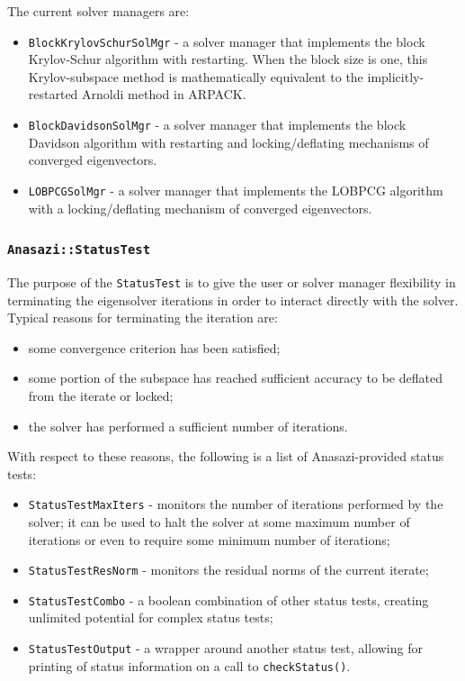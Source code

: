 \documentclass[acmtoms,acmnow]{acmtrans2m}
\newcommand{\aspace}[1]{\texttt{#1}}
\begin{document}
The current solver managers are:
\begin{itemize}
\item
\aspace{BlockKrylovSchurSolMgr} - a solver manager that implements the block Krylov-Schur
algorithm with restarting.  When the block size is one, this Krylov-subspace method is
mathematically equivalent to the implicitly-restarted Arnoldi method in ARPACK.
\item
\aspace{BlockDavidsonSolMgr} - a solver manager that implements the block Davidson
algorithm with restarting and locking/deflating mechanisms of converged eigenvectors.
\item
\aspace{LOBPCGSolMgr} - a solver manager that implements the LOBPCG algorithm with a
locking/deflating mechanism of converged eigenvectors.
\end{itemize}


\subsubsection{\aspace{Anasazi::StatusTest}}

The purpose of the \aspace{StatusTest} is to give the user or solver
manager flexibility in terminating the eigensolver iterations in
order to interact directly with the solver. Typical
reasons for terminating the iteration are:
\begin{itemize}
  \item some convergence criterion has been satisfied;
  \item some portion of the subspace has reached sufficient accuracy to be
  deflated from the iterate or locked;
  \item the solver has performed a sufficient number of iterations.
\end{itemize}
With respect to these reasons, the following is a list of Anasazi-provided status tests:
\begin{itemize}
  \item \aspace{StatusTestMaxIters} - monitors the number of iterations
    performed by the solver; it can be used to halt the solver at some maximum number of iterations
    or even to require some minimum number of iterations;
  \item \aspace{StatusTestResNorm} - monitors the residual norms of the
    current iterate;
  \item \aspace{StatusTestCombo} - a boolean combination of
    other status tests, creating unlimited potential for complex status tests;
  \item \aspace{StatusTestOutput} - a wrapper around another
    status test, allowing for printing of status information on a call to
    \verb!checkStatus()!.
\end{itemize}
\end{document}
